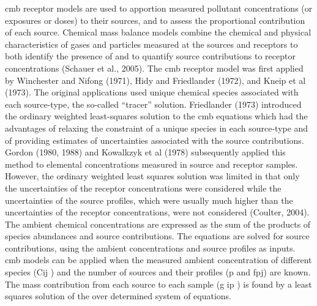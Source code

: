 \documentclass{nwureport}
\begin{document}
\gls{cmb} receptor models are used to apportion measured pollutant concentrations (or
exposures or doses) to their sources, and to assess the proportional contribution of each source. Chemical
mass balance models combine the chemical and physical characteristics of gases and particles measured at
the sources and receptors to both identify the presence of and to quantify source contributions to receptor
concentrations (Schauer et al., 2005). The \gls{cmb} receptor model was first applied by Winchester and Nifong
(1971), Hidy and Friedlander (1972), and Kneip et al (1973). The original applications used unique chemical
species associated with each source-type, the so-called “tracer” solution. Friedlander (1973) introduced the
ordinary weighted least-squares solution to the \gls{cmb} equations which had the advantages of relaxing the
constraint of a unique species in each source-type and of providing estimates of uncertainties associated
with the source contributions. Gordon (1980, 1988) and Kowalkzyk et al (1978) subsequently applied this
method to elemental concentrations measured in source and receptor samples. However, the ordinary
weighted least squares solution was limited in that only the uncertainties of the receptor concentrations were
considered while the uncertainties of the source profiles, which were usually much higher than the
uncertainties of the receptor concentrations, were not considered (Coulter, 2004). The ambient chemical
concentrations are expressed as the sum of the products of species abundances and source
contributions. The equations are solved for source contributions, using the ambient concentrations and
source profiles as inputs. \gls{cmb} models can be applied when the measured ambient concentration of different
species (Cij ) and the number of sources and their profiles (p and fpj) are known. The mass contribution
from each source to each sample (g ip ) is found by a least squares solution of the over determined system of
equations.
\end{document}

